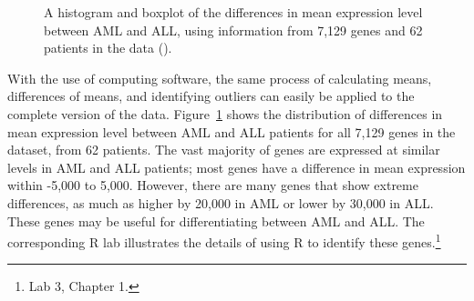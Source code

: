 \begin{figure}[h!]
	\centering
	\caption{A histogram and boxplot of the differences in mean expression level between AML and ALL, using information from 7,129 genes and 62 patients in the  data ().}
	\label{golubHistandBox}
\end{figure}

With the use of computing software, the same process of calculating means, differences of means, and identifying outliers can easily be applied to the complete version of the data. Figure~\ref{golubHistandBox} shows the distribution of differences in mean expression level between AML and ALL patients for all 7,129 genes in the dataset, from 62 patients. The vast majority of genes are expressed at similar levels in AML and ALL patients; most genes have a difference in mean expression within -5,000 to 5,000. However, there are many genes that show extreme differences, as much as higher by 20,000 in AML or lower by 30,000 in ALL. These genes may be useful for differentiating between AML and ALL. The corresponding \textsf{R} lab illustrates the details of using \textsf{R} to identify these genes.\footnote{Lab 3, Chapter 1.}

